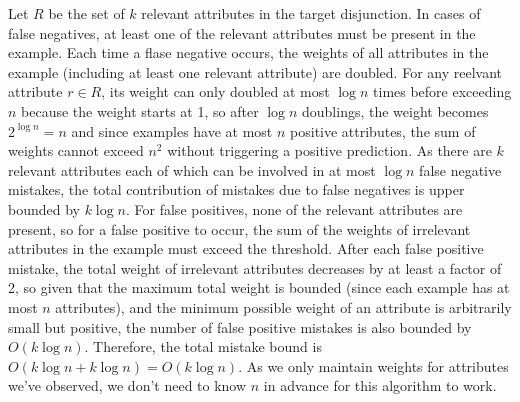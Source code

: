 \documentclass[11pt]{article}
\DeclareMathOperator{\1}{\mathbbm{1}}
\begin{document}
\begin{problem} [15pts]
Let $R$ be the set of $k$ relevant attributes in the target disjunction. In cases of false negatives, at least one of the relevant attributes must be present in the example. Each time a flase negative occurs, the weights of all attributes in the example (including at least one relevant attribute) are doubled. For any reelvant attribute $r \in R$, its weight can only doubled at most $\log n$ times before exceeding $n$ because the weight starts at 1, so after $\log n$ doublings, the weight becomes $2^{\log n} = n$ and since examples have at most $n$ positive attributes, the sum of weights cannot exceed $n^2$ without triggering a positive prediction. As there are $k$ relevant attributes each of which can be involved in at most $\log n$ false negative mistakes, the total contribution of mistakes due to false negatives is upper bounded by $k \log n$. For false positives, none of the relevant attributes are present, so for a false positive to occur, the sum of the weights of irrelevant attributes in the example must exceed the threshold. After each false positive mistake, the total weight of irrelevant attributes decreases by at least a factor of 2, so given that the maximum total weight is bounded (since each example has at most $n$ attributes), and the minimum possible weight of an attribute is arbitrarily small but positive, the number of false positive mistakes is also bounded by $O(k \log n)$. Therefore, the total mistake bound is $O(k \log n + k \log n) = O(k \log n)$. As we only maintain weights for attributes we've observed, we don't need to know $n$ in advance for this algorithm to work.
\end{problem}
\end{document}
